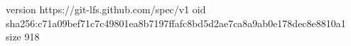 version https://git-lfs.github.com/spec/v1
oid sha256:c71a09bef71c7c49801ea8b7197ffafc8bd5d2ae7ca8a9ab0e178dec8e8810a1
size 918
